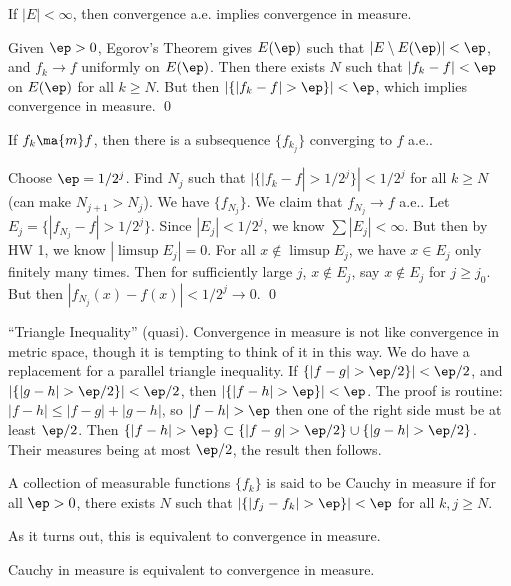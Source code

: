 \begin{thm}
If $|E|<\infty$, then convergence a.e. implies convergence in measure.
\end{thm}

\pf Given $\ep>0$, Egorov's Theorem gives $E(\ep)$ such that $|E \setminus E(\ep)|<\ep$, and $f_k \to f$ uniformly on $E(\ep)$. Then there exists $N$ such that $|f_k-f|<\ep$ on $E(\ep)$ for all $k \geq N$. But then $|\{ |f_k-f|>\ep\}|<\ep$, which implies convergence in measure. \qed \\


\begin{thm}
If $f_k \ma{m} f$, then there is a subsequence $\{f_{k_j}\}$ converging to $f$ a.e.. 
\end{thm}

\pf Choose $\ep=1/2^j$. Find $N_j$ such that $|\{ |f_k-f|>1/2^j\}|<1/2^j$ for all $k \geq N$ (can make $N_{j+1}>N_j$). We have $\{f_{N_j}\}$. We claim that $f_{N_j} \to f$ a.e.. Let $E_j= \{ |f_{N_j}-f|>1/2^j\}$. Since $|E_j|<1/2^j$, we know $\sum |E_j|<\infty$. But then by HW 1, we know $|\limsup E_j|=0$. For all $x \notin \limsup E_j$, we have $x \in E_j$ only finitely many times. Then for sufficiently large $j$, $x \notin E_j$, say $x \notin E_j$ for $j \geq j_0$. But then $|f_{N_j}(x) - f(x)|<1/2^j \to 0$. \qed \\


\begin{rem}
``Triangle Inequality'' (quasi). Convergence in measure is not like convergence in metric space, though it is tempting to think of it in this way. We do have a replacement for a parallel triangle inequality. If $\{ |f-g|>\ep/2\}|<\ep/2$, and $|\{|g-h|>\ep/2\}|<\ep/2$, then $|\{ |f-h|>\ep\}|<\ep$. The proof is routine: $|f-h| \leq |f-g| + |g-h|$, so $|f-h|>\ep$ then one of the right side must be at least $\ep/2$. Then $\{|f-h|>\ep\} \subset \{|f-g|>\ep/2\} \cup \{|g-h|>\ep/2\}$. Their measures being at most $\ep/2$, the result then follows. 
\end{rem}


\begin{dfn}
A collection of measurable functions $\{f_k\}$ is said to be Cauchy in measure if for all $\ep>0$, there exists $N$ such that $|\{ |f_j-f_k|>\ep\}|<\ep$ for all $k,j \geq N$. 
\end{dfn}


As it turns out, this is equivalent to convergence in measure.


\begin{thm}
Cauchy in measure is equivalent to convergence in measure. 
\end{thm}

